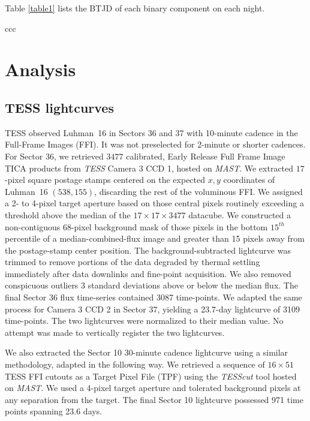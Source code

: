\documentclass[modern]{aastex631}
\begin{document}
Table \ref{table1} lists the BTJD of each binary component on each night.

\begin{deluxetable}{ccc}
  \startdata
  
  \enddata

\end{deluxetable}

\section{Analysis}

\subsection{TESS lightcurves}

TESS observed Luhman~16 in Sectors 36 and 37 with 10-minute cadence in the Full-Frame Images (FFI).  It was not preselected for 2-minute or shorter cadences.  For Sector 36, we retrieved $3477$ calibrated, Early Release Full Frame Image TICA products \citep{2020RNAAS...4..251F} from \emph {TESS} Camera 3 CCD 1, hosted on \emph{MAST}.  We extracted $17$-pixel square postage stamps centered on the expected $x,y$ coordinates of Luhman~16 $(538, 155)$, discarding the rest of the voluminous FFI.  We assigned a 2- to 4-pixel target aperture based on those central pixels routinely exceeding a threshold above the median of the $17\times17\times3477$ datacube. We constructed a non-contiguous 68-pixel background mask of those pixels in the bottom $15^{th}$ percentile of a median-combined-flux image and greater than 15 pixels away from the postage-stamp center position. The background-subtracted lightcurve was trimmed to remove portions of the data degraded by thermal settling immediately after data downlinks and fine-point acquisition.  We also removed conspicuous outliers 3 standard deviations above or below the median flux.  The final Sector 36 flux time-series contained 3087 time-points.  We adapted the same process for Camera 3 CCD 2 in Sector 37, yielding a 23.7-day lightcurve of 3109 time-points.  The two lightcurves were normalized to their median value.  No attempt was made to vertically register the two lightcurves.

We also extracted the Sector 10 30-minute cadence lightcurve using a similar methodology, adapted in the following way.  We retrieved a sequence of $16\times51$ TESS FFI cutouts as a Target Pixel File (TPF) using the \emph{TESScut} tool hosted on \emph{MAST}.  We used a 4-pixel target aperture and tolerated background pixels at any separation from the target.  The final Sector 10 lightcurve possessed 971 time points spanning 23.6 days.
\end{document}
